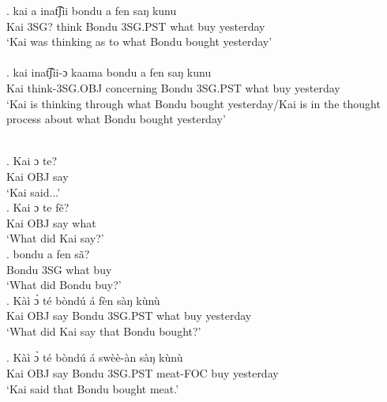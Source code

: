 \documentclass{assets/fieldnotes}
\begin{document}
\exg. kai a inat͡ʃii bondu a fen saŋ kunu\\
Kai 3SG? think Bondu 3SG.PST what buy yesterday\\
`Kai was thinking as to what Bondu bought yesterday' \\

\\



\exg. kai inat͡ʃii-ɔ kaama bondu a fen saŋ kunu\\
Kai think-3SG.OBJ concerning Bondu 3SG.PST what buy yesterday\\
`Kai is thinking through what Bondu bought yesterday/Kai is in the thought process about what Bondu bought yesterday'\\

\\



\exg. Kai ɔ te?\\
Kai OBJ say\\
`Kai said...' \\

\exg. Kai ɔ te fẽ?\\
Kai OBJ say what\\
`What did Kai say?'  \\

\exg. bondu a fen sã?\\
Bondu 3SG what buy \\
`What did Bondu buy?' \\


\exg. Kàì ɔ̀ té bòndú á fèn sàŋ kùnù\\
Kai OBJ say Bondu 3SG.PST what buy yesterday\\
`What did Kai say that Bondu bought?'\\



\exg. Kàì ɔ̀ té bòndú á swèè-àn sàŋ kùnù\\
Kai OBJ say Bondu 3SG.PST meat-FOC buy yesterday\\
`Kai said that Bondu bought meat.'\\

\end{document}

